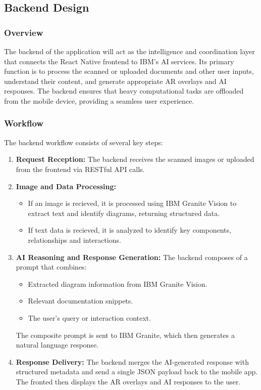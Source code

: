 \documentclass[10pt]{article}
\begin{document}
    \subsection{Backend Design}

        \subsubsection{Overview}

            The backend of the application will act as the intelligence and coordination layer that connects the React Native frontend to IBM's AI services. Its primary function is to process
            the scanned or uploaded documents and other user inputs, understand their content, and generate appropriate AR overlays and AI responses. The backend ensures that heavy computational
            tasks are offloaded from the mobile device, providing a seamless user experience.

        \subsubsection{Workflow}

        The backend workflow consists of several key steps:
        \begin{enumerate}
            \item \textbf{Request Reception:} The backend receives the scanned images or uploaded from the frontend via RESTful API calls.
            \item \textbf{Image and Data Processing:}
                \begin{itemize}
                    \item If an image is recieved, it is processed using IBM Granite Vision to extract text and identify diagrams, returning structured data.
                    \item If text data is recieved, it is analyzed to identify key components, relationships and interactions.
                \end{itemize}
            \item \textbf{AI Reasoning and Response Generation:} The backend composes of a prompt that combines:
                \begin{itemize}
                    \item Extracted diagram information from IBM Granite Vision.
                    \item Relevant documentation snippets.
                    \item The user's query or interaction context.
                \end{itemize}

                The composite prompt is sent to IBM Granite, which then generates a natural language response.
            \item \textbf{Response Delivery:} The backend merges the AI-generated response with structured metadata and send a single JSON payload back to the mobile app. The fronted then
            displays the AR overlays and AI responses to the user.
        \end{enumerate}
\end{document}
